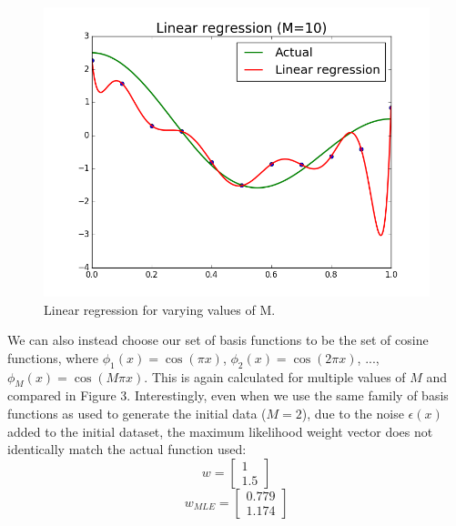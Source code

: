 \documentclass{article}
\begin{document}
\begin{figure}[width=\linewidth]
\begin{multicols}{2}
  \includegraphics[width=1.2\linewidth]{code/P2/linear_regression,10.png}
\end{multicols}
\caption{Linear regression for varying values of M.}
\end{figure}

We can also instead choose our set of basis functions to be the set of cosine functions, where $\phi_1(x) = \cos(\pi x)$, $\phi_2(x) = \cos(2 \pi x)$, ..., $\phi_M(x) = \cos(M \pi x)$. This is again calculated for multiple values of $M$ and compared in Figure 3. Interestingly, even when we use the same family of basis functions as used to generate the initial data ($M=2$), due to the noise $\epsilon(x)$ added to the initial dataset, the maximum likelihood weight vector does not identically match the actual function used:
$$ w =
\begin{bmatrix}
  1 \\
  1.5
\end{bmatrix}$$
$$ w_{MLE} =
\begin{bmatrix}
  0.779 \\
  1.174
\end{bmatrix}$$
\end{document}

